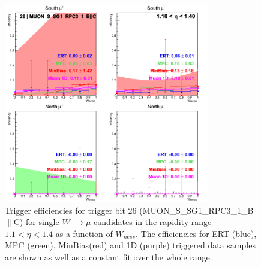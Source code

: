 \begin{figure}[h!]

  \centering

  \includegraphics[width=0.8\textwidth]{./figures/run13_trigeffisn_eta0_trig26_lin.png}
  \caption{\label{fig:run13_trigeffisn_eta0_nper0_trig26_lin} Trigger efficiencies for trigger bit 26 (MUON\_S\_SG1\_RPC3\_1\_B$\|$C) for single $W$ $\rightarrow \mu$ candidates in the rapidity range $ 1.1 < \eta < 1.4$ as a function of $W_{ness}$. The efficiencies for ERT (blue), MPC (green), MinBias(red) and 1D (purple) triggered data samples are shown as well as a constant fit over the whole range.}

\end{figure}
\clearpage
